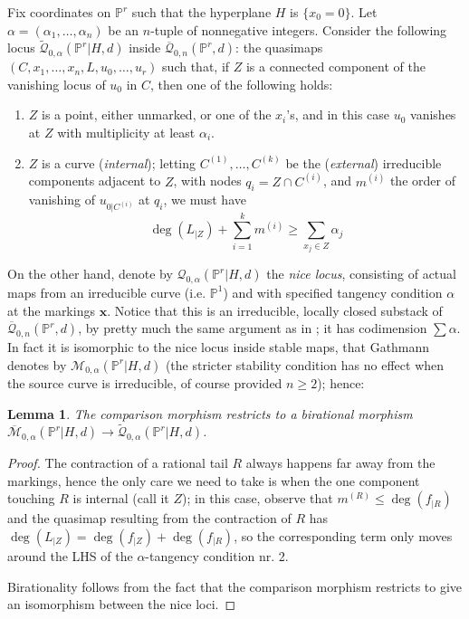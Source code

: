 \documentclass[11pt]{amsart}
\newcommand{\M}[4]{\overline{\mathcal M}_{#1,#2}(#3,#4)}
\newcommand{\Q}[4]{\overline{\mathcal Q}_{#1,#2}(#3,#4)}
\newcommand{\Qt}[4]{\widetilde{\mathcal Q}_{#1,#2}(#3,#4)}
\newcommand{\PP}{\mathbb P}
\renewcommand{\to}{\rightarrow}
\theoremstyle{plain}
\newtheorem{lem}[thm]{Lemma}
\theoremstyle{definition}
\begin{document}
Fix coordinates on $\PP^r$ such that the hyperplane $H$ is $\{x_0=0\}$. Let $\alpha=(\alpha_1,\ldots,\alpha_n)$ be an $n$-tuple of nonnegative integers. Consider the following locus $\Qt{0}{\alpha}{\PP^r|H}{d}$ inside $\Q{0}{n}{\PP^r}{d}$: the quasimaps $(C,x_1,\ldots,x_n,L,u_0,\ldots,u_r)$ such that, if $Z$ is a connected component of the vanishing locus of $u_0$ in $C$, then one of the following holds:

\begin{enumerate}
\item $Z$ is a point, either unmarked, or one of the $x_i$'s, and in this case $u_0$ vanishes at $Z$ with multiplicity at least $\alpha_i$.
\item $Z$ is a curve (\emph{internal}); letting $C^{(1)},\ldots,C^{(k)}$ be the (\emph{external}) irreducible components adjacent to $Z$, with nodes $q_i=Z\cap C^{(i)}$, and $m^{(i)}$ the order of vanishing of $u_{0|C^{(i)}}$ at $q_i$, we must have
\[
\deg(L_{|Z})+\sum_{i=1}^k m^{(i)}\geq\sum_{x_j\in Z} \alpha_j
\]
\end{enumerate}

On the other hand, denote by $\mathcal Q_{0,\alpha}(\PP^r|H,d)$ the \emph{nice locus}, consisting of actual maps from an irreducible curve (i.e. $\PP^1$) and with specified tangency condition $\alpha$ at the markings $\mathbf x$. Notice that this is an irreducible, locally closed substack of $\Q{0}{n}{\PP^r}{d}$, by pretty much the same argument as in \cite[Lemma 1.8]{Ga}; it has codimension $\sum\alpha$. In fact it is isomorphic to the nice locus inside stable maps, that Gathmann denotes by $\mathcal M_{0,\alpha}(\PP^r|H,d)$ \cite[Def. 1.6]{Ga} (the stricter stability condition has no effect when the source curve is irreducible, of course provided $n\geq2$); hence:

\begin{lem}\label{lem:comparison}
The comparison morphism restricts to a birational morphism $\M{0}{\alpha}{\PP^r|H}{d}\to \Qt{0}{\alpha}{\PP^r|H}{d}$.
\end{lem}
\begin{proof}
The contraction of a rational tail $R$ always happens far away from the markings, hence the only care we need to take is when the one component touching $R$ is internal (call it $Z$); in this case, observe that $m^{(R)}\leq\deg(f_{|R})$ and the quasimap resulting from the contraction of $R$ has $\deg(L_{|Z})=\deg(f_{|Z})+\deg(f_{|R})$, so the corresponding term only moves around the LHS of the $\alpha$-tangency condition nr. 2.

Birationality follows from the fact that the comparison morphism restricts to give an isomorphism between the nice loci.
\end{proof}
\end{document}

